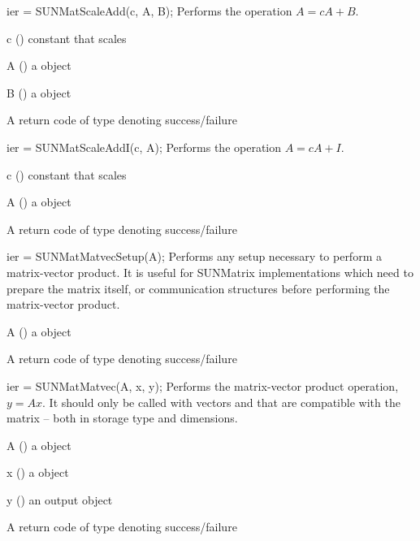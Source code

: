 {
  ier = SUNMatScaleAdd(c, A, B);
}
{
  Performs the operation $A = cA + B$.
}
{
  \begin{args}[c]
  \item[c] () constant that scales 
  \item[A] () a {\sunmatrix} object
  \item[B] () a {\sunmatrix} object
  \end{args}
}
{
  A {\sunmatrix} return code of type  denoting success/failure
}
{}

{
  ier = SUNMatScaleAddI(c, A);
}
{
  Performs the operation $A = cA + I$.
}
{
  \begin{args}[c]
  \item[c] () constant that scales 
  \item[A] () a {\sunmatrix} object
  \end{args}
}
{
  A {\sunmatrix} return code of type  denoting success/failure
}
{}

{
  ier = SUNMatMatvecSetup(A);
}
{
  Performs any setup necessary to perform a matrix-vector product.
  It is useful for SUNMatrix implementations which need to prepare
  the matrix itself, or communication structures before performing
  the matrix-vector product.
}
{
  \begin{args}[A]
  \item[A] () a {\sunmatrix} object
  \end{args}
}
{
  A {\sunmatrix} return code of type  denoting success/failure
}
{}

{
  ier = SUNMatMatvec(A, x, y);
}
{
  Performs the matrix-vector product operation, $y = Ax$. It should
  only be called with vectors  and  that are compatible with
  the matrix  -- both in storage type and dimensions.
}
{
  \begin{args}[A]
  \item[A] () a {\sunmatrix} object
  \item[x] () a {\nvector} object
  \item{y} () an output {\nvector} object
  \end{args}
}
{
  A {\sunmatrix} return code of type  denoting success/failure
}
{}


